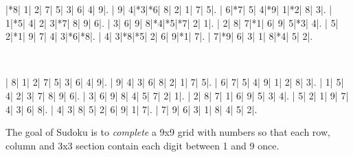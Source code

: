 \documentclass{cons-beamer}
\begin{document}
\begin{frame}[fragile]
  \begin{example}[Sudoku]
    \begin{center}
      \vspace{2mm}
      \PuzzleUnitlength=11pt
      \renewcommand*\SudokuLinethickness{1pt}
      \renewcommand*\PuzzleFont{\sf\tiny}
      \begin{Sudoku}
        |*8| 1| 2| 7| 5| 3| 6| 4| 9|.
        | 9| 4|*3|*6| 8| 2| 1| 7| 5|.
        | 6|*7| 5| 4|*9| 1|*2| 8| 3|.
        | 1|*5| 4| 2| 3|*7| 8| 9| 6|.
        | 3| 6| 9| 8|*4|*5|*7| 2| 1|.
        | 2| 8| 7|*1| 6| 9| 5|*3| 4|.
        | 5| 2|*1| 9| 7| 4| 3|*6|*8|.
        | 4| 3|*8|*5| 2| 6| 9|*1| 7|.
        | 7|*9| 6| 3| 1| 8|*4| 5| 2|.
      \end{Sudoku}
      ~~~~~ 
      \PuzzleSolution
      \begin{Sudoku}
        | 8| 1| 2| 7| 5| 3| 6| 4| 9|.
        | 9| 4| 3| 6| 8| 2| 1| 7| 5|.
        | 6| 7| 5| 4| 9| 1| 2| 8| 3|.
        | 1| 5| 4| 2| 3| 7| 8| 9| 6|.
        | 3| 6| 9| 8| 4| 5| 7| 2| 1|.
        | 2| 8| 7| 1| 6| 9| 5| 3| 4|.
        | 5| 2| 1| 9| 7| 4| 3| 6| 8|.
        | 4| 3| 8| 5| 2| 6| 9| 1| 7|.
        | 7| 9| 6| 3| 1| 8| 4| 5| 2|.
      \end{Sudoku}
    \end{center}
    \vspace{-2mm}
    The goal of Sudoku is to \textit{complete} a 9x9 grid with numbers so that each row, column and 3x3 section contain each digit between 1 and 9 once.  %
  \end{example}
\end{frame}
\end{document}
